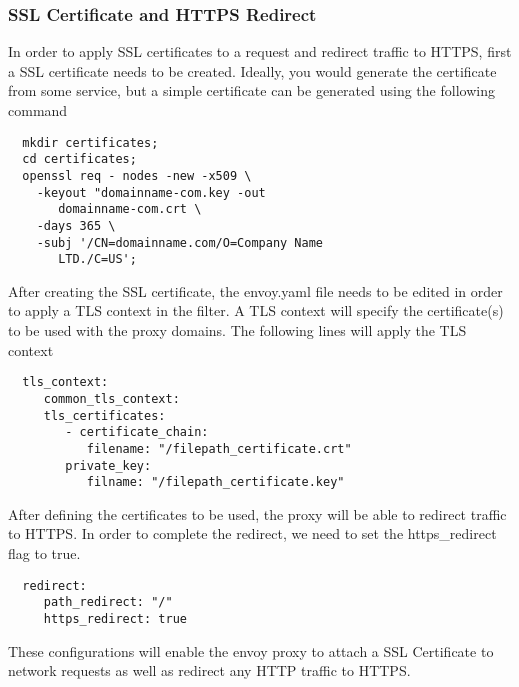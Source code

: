 \subsubsection{SSL Certificate and HTTPS Redirect}
In order to apply SSL certificates to a request and redirect traffic to HTTPS, first a SSL certificate needs to be created.
Ideally, you would generate the certificate from some service, but a simple certificate can be generated using the following command
\begin{verbatim}
  mkdir certificates;
  cd certificates;
  openssl req - nodes -new -x509 \
    -keyout "domainname-com.key -out 
       domainname-com.crt \
    -days 365 \
    -subj '/CN=domainname.com/O=Company Name 
       LTD./C=US';
\end{verbatim}
After creating the SSL certificate, the envoy.yaml file needs to be edited in order to apply a TLS context in the filter.
A TLS context will specify the certificate(s) to be used with the proxy domains. The following lines will apply the TLS context
\begin{verbatim}
  tls_context:
     common_tls_context:
     tls_certificates:
        - certificate_chain:
           filename: "/filepath_certificate.crt"
        private_key:
           filname: "/filepath_certificate.key"
\end{verbatim}
After defining the certificates to be used, the proxy will be able to redirect traffic to HTTPS. In order to complete the
redirect, we need to set the https_redirect flag to true.
\begin{verbatim}
  redirect:
     path_redirect: "/"
     https_redirect: true    
\end{verbatim}
These configurations will enable the envoy proxy to attach a SSL Certificate to network requests as well as redirect any
HTTP traffic to HTTPS.

